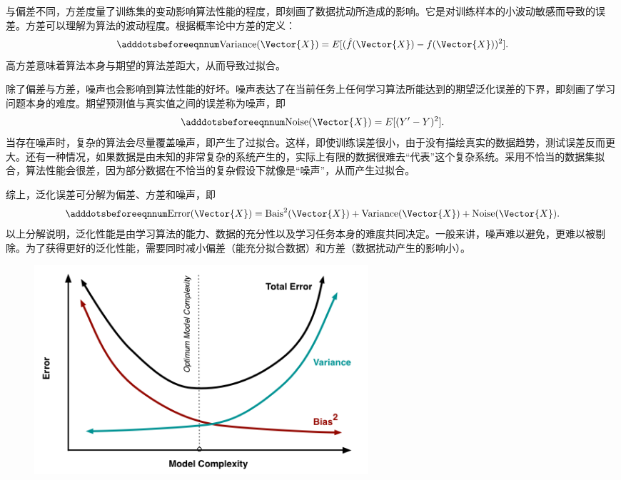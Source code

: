 与偏差不同，方差度量了训练集的变动影响算法性能的程度，即刻画了数据扰动所造成的影响。它是对训练样本的小波动敏感而导致的误差。方差可以理解为算法的波动程度。根据概率论中方差的定义：
\begin{equation}\adddotsbeforeeqnnum
  \label{eq:ml_variance}
  \text{Variance}(\Vector{X})=E[(\hat{f}(\Vector{X})-f(\Vector{X}))^2].
\end{equation}
高方差意味着算法本身与期望的算法差距大，从而导致过拟合。

除了偏差与方差，噪声也会影响到算法性能的好坏。噪声表达了在当前任务上任何学习算法所能达到的期望泛化误差的下界，即刻画了学习问题本身的难度。期望预测值与真实值之间的误差称为噪声，即
\begin{equation}\adddotsbeforeeqnnum
  \label{eq:ml_noise}
  \text{Noise}(\Vector{X})=E[(Y^{\prime}-Y)^2].
\end{equation}
当存在噪声时，复杂的算法会尽量覆盖噪声，即产生了过拟合。这样，即使训练误差很小，由于没有描绘真实的数据趋势，测试误差反而更大。还有一种情况，如果数据是由未知的非常复杂的系统产生的，实际上有限的数据很难去“代表”这个复杂系统。采用不恰当的数据集拟合，算法性能会很差，因为部分数据在不恰当的复杂假设下就像是“噪声”，从而产生过拟合。

综上，泛化误差可分解为偏差、方差和噪声，即
\begin{equation}\adddotsbeforeeqnnum
  \label{eq:ml_error}
  \text{Error}(\Vector{X})=\text{Bais}^2(\Vector{X})+\text{Variance}(\Vector{X})+\text{Noise}(\Vector{X}).
\end{equation}
以上分解说明，泛化性能是由学习算法的能力、数据的充分性以及学习任务本身的难度共同决定。一般来讲，噪声难以避免，更难以被剔除。为了获得更好的泛化性能，需要同时减小偏差（能充分拟合数据）和方差（数据扰动产生的影响小）。

\begin{figure}[!htbp]
  \centering
  \includegraphics[width=0.6\textwidth]{Img/chap2_ml/bias.png}
  \label{fig:ml_bias}
\end{figure}

